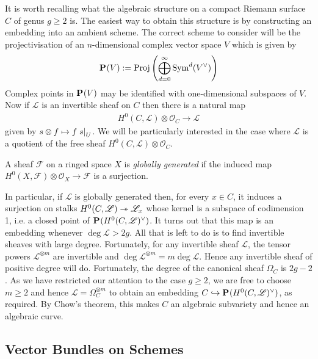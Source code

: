 \documentclass[12pt]{ociamthesis}  %
\begin{document}
It is worth recalling what the algebraic structure on a compact
Riemann surface $C$ of genus $g\geq 2$ is. The easiest way to obtain
this structure is by constructing an embedding into an ambient
scheme. The correct scheme to consider will be the projectivisation
of an $n$-dimensional complex vector space $V$ which is given
by
\begin{align*}
  \mathbf{P}^{}_{}(V) := \operatorname{Proj}\left({
        \bigoplus_{d=0}^\infty \operatorname{Sym}^d(V^\vee)
      }\right)
\end{align*}
Complex points in $\mathbf{P}^{}_{}(V)$ may be identified
with one-dimensional subspaces of $V$. \missingcitation
Now if $\mathscr L$ is
an invertible sheaf on $C$ then there is a natural map
\begin{align}\label{eq:natural_line_bundle_map}
  H^0(C,\mathscr L)\otimes\mathscr O_C \to \mathscr L
\end{align}
given by $s\otimes f \mapsto f\left.{s}\right\vert_{U}$. We will be
particularly interested in the case where $\mathscr L$ is a
quotient of the free sheaf $H^0(C,\mathscr L)\otimes\mathscr O_C$.

\begin{definition}
  A sheaf $\mathscr F$ on a ringed space $X$ is
  \emph{globally generated} if the induced map
  $H^0(X,\mathscr F) \otimes \mathscr O_X \to \mathscr F$
  is a surjection.
\end{definition}

In particular, if $\mathscr L$ is globally generated then,
for every $x\in C$, it induces a surjection on stalks
$H^0(C,\mathscr L) \twoheadrightarrow \mathscr L_x$ whose kernel is a
subspace of codimension 1, i.e. a closed point of
$\mathbf{P}^{}_{}(H^0(C,\mathscr L)^\vee)$. It turns out that this map is an embedding
whenever $\deg\mathscr L > 2g$. \cite[Proposition 2.14]{harris2011}
All that is left to do is to find invertible sheaves with large
degree. Fortunately, for any invertible sheaf $\mathscr L$,
the tensor powers $\mathscr L^{\otimes m}$ are invertible and
$\deg\mathscr L^{\otimes m} = m\deg\mathscr L$. Hence any invertible
sheaf of positive degree will do. Fortunately, the degree of
the canonical sheaf $\Omega_C$ is $2g-2$. As we have restricted
our attention to the case $g\geq 2$, we are free to choose
$m\geq 2$ and hence $\mathscr L = \Omega_C^{\otimes m}$ to obtain
an embedding $C\hookrightarrow\mathbf{P}^{}_{}(H^0(C,\mathscr L)^\vee)$, as
required.
By Chow's theorem, this makes $C$ an algebraic subvariety
and hence an algebraic curve.

\subsection{Vector Bundles on Schemes}
\end{document}
